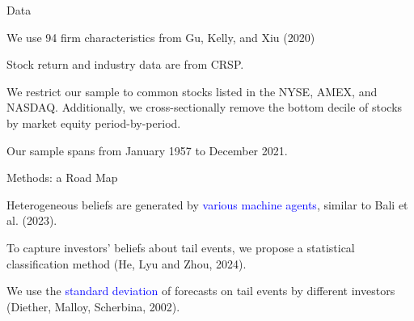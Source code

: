 \documentclass[11pt, aspectratio=169]{beamer}
\newenvironment{wideitemize}{\itemize\addtolength{\itemsep}{10pt}}{\enditemize}
\begin{document}
\begin{frame}{Data}
\bigskip
\begin{wideitemize}
\item We use 94 firm characteristics from Gu, Kelly, and Xiu (2020) %
\item Stock return and industry data are from CRSP.
\item We restrict our sample to common stocks listed in the NYSE, AMEX, and NASDAQ. Additionally, we cross-sectionally remove the bottom decile of stocks by market equity period-by-period.
\item Our sample spans from January 1957 to December 2021.
\end{wideitemize}
\end{frame}

\begin{frame}{Methods: a Road Map}
\bigskip
\begin{wideitemize}
\item Heterogeneous beliefs are generated by \textcolor{blue}{various machine agents}, similar to Bali et al. (2023).

\item To capture investors' beliefs about tail events, we propose a statistical \alert{classification} method (He, Lyu and Zhou, 2024).

\item We use the \textcolor{blue}{standard deviation} of forecasts on tail events by different investors (Diether, Malloy, Scherbina, 2002).
\end{wideitemize}
\end{frame}

\end{document}
